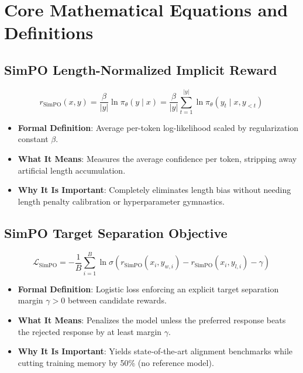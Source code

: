 \documentclass[11pt,a4paper]{article}
\theoremstyle{definition}
\begin{document}
\section{Core Mathematical Equations and Definitions}

\subsection{SimPO Length-Normalized Implicit Reward}
{\boldmath
\begin{equation}
r_{\text{SimPO}}(x, y) = \frac{\beta}{|y|} \ln \pi_\theta(y \mid x) = \frac{\beta}{|y|} \sum_{t=1}^{|y|} \ln \pi_\theta(y_t \mid x, y_{<t})
\end{equation}
}
\begin{itemize}
    \item \textbf{Formal Definition}: Average per-token log-likelihood scaled by regularization constant $\beta$.
    \item \textbf{What It Means}: Measures the average confidence per token, stripping away artificial length accumulation.
    \item \textbf{Why It Is Important}: Completely eliminates length bias without needing length penalty calibration or hyperparameter gymnastics.
\end{itemize}

\subsection{SimPO Target Separation Objective}
{\boldmath
\begin{equation}
\mathcal{L}_{\text{SimPO}} = - \frac{1}{B}\sum_{i=1}^B \ln \sigma\left( r_{\text{SimPO}}(x_i, y_{w, i}) - r_{\text{SimPO}}(x_i, y_{l, i}) - \gamma \right)
\end{equation}
}
\begin{itemize}
    \item \textbf{Formal Definition}: Logistic loss enforcing an explicit target separation margin $\gamma > 0$ between candidate rewards.
    \item \textbf{What It Means}: Penalizes the model unless the preferred response beats the rejected response by at least margin $\gamma$.
    \item \textbf{Why It Is Important}: Yields state-of-the-art alignment benchmarks while cutting training memory by 50\% (no reference model).
\end{itemize}
\end{document}
